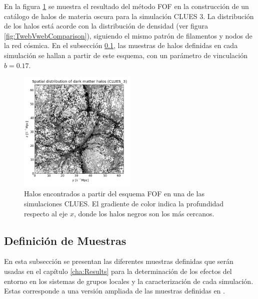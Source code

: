 En la figura \ref{fig:CLUES_FOF} se muestra el resultado del método FOF en
la construcción de un catálogo de halos de materia oscura para la simulación
CLUES 3. La distribución de los halos está acorde con la distribución de 
densidad (ver figura \ref{fig:TwebVwebComparison}), siguiendo el mismo patrón
de filamentos y nodos de la red cósmica. En el subsección 
\ref{subsec:SampleOfPairsToUse}, las muestras de halos definidas en cada 
simulación se hallan a partir de este esquema, con un parámetro de 
vinculación $b = 0.17$.


\begin{figure}[htbp]
	\centering
	\includegraphics[width=0.5\textwidth]
	{./figures/3_nbody_simulations/Halos_Spatial_Distribution(CLUES_16953).png}

	\caption{\small{Halos encontrados a partir del esquema FOF en una de 
	las	simulaciones CLUES. El gradiente de color indica la profundidad 
	respecto al eje $x$, donde los halos negros son los más cercanos.}}
	
	\label{fig:CLUES_FOF}
\end{figure}


	\subsection{Definición de Muestras}
	\label{subsec:SampleOfPairsToUse}
	

En esta subsección se presentan las diferentes muestras definidas que serán 
usadas en el capítulo \ref{cha:Results} para la determinación de los efectos 
del entorno en los sistemas de grupos locales y la caracterización de cada 
simulación. Estas corresponde a una versión ampliada de las muestras 
definidas en \cite{forero2011}.


